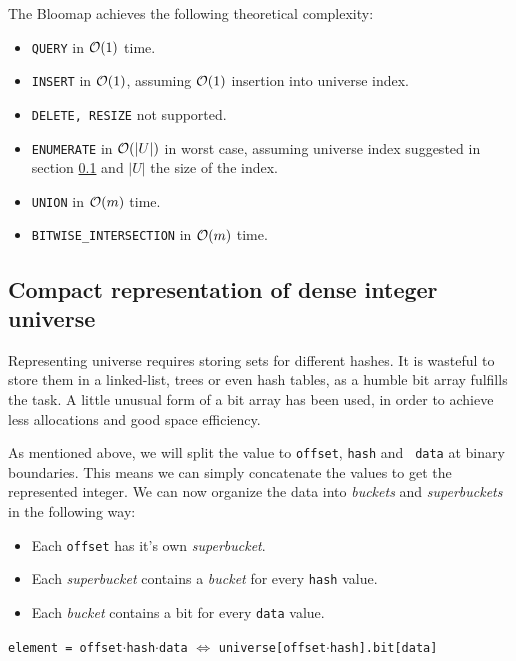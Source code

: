 The Bloomap achieves the following theoretical complexity:

\begin{itemize}
	\item {\tt QUERY} in $\mathcal{O}(1)$ time.
	\item {\tt INSERT} in $\mathcal{O}(1)$, assuming $\mathcal{O}(1)$ insertion into universe
		index.
	\item {\tt DELETE{\rm ,} RESIZE} not supported.
	\item {\tt ENUMERATE} in $\mathcal{O}(|U|)$ in worst case, assuming universe index
		suggested in section \ref{sec-compact-representation} and $|U|$ the size
		of the index.
	\item {\tt UNION} in $\mathcal{O}(m)$ time.
	\item {\tt BITWISE\_INTERSECTION} in $\mathcal{O}(m)$ time.
\end{itemize}

\subsection{Compact representation of dense integer universe}
\label{sec-compact-representation}

Representing universe requires storing sets for different hashes. It is wasteful
to store them in a linked-list, trees or even hash tables, as a humble bit array
fulfills the task. A little unusual form of a bit array has been used, in order
to achieve less allocations and good space efficiency.

As mentioned above, we will split the value to {\tt offset}, {\tt hash} and {\tt
data} at binary boundaries. This means we can simply concatenate the values to
get the represented integer. We can now organize the data into {\it buckets} and
{\it superbuckets} in the following way:

\begin{itemize}
	\item Each {\tt offset} has it's own {\it superbucket}.
	\item Each {\it superbucket} contains a {\it bucket} for every {\tt hash} value.
	\item Each {\it bucket} contains a bit for every {\tt data} value.
\end{itemize}

\begin{center}
	{\tt element = offset$\cdot$hash$\cdot$data} $\Leftrightarrow$
	{\tt universe[offset$\cdot$hash].bit[data]}
\end{center}

